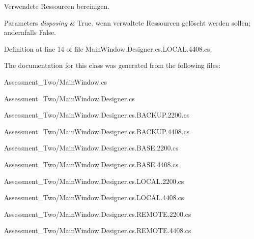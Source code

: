Verwendete Ressourcen bereinigen. 


\begin{DoxyParams}{Parameters}
{\em disposing} & True, wenn verwaltete Ressourcen gelöscht werden sollen; andernfalls False.\\
\hline
\end{DoxyParams}


Definition at line 14 of file MainWindow.Designer.cs.LOCAL.4408.cs.



The documentation for this class was generated from the following files:\begin{DoxyCompactItemize}
\item 
Assessment\_\-Two/MainWindow.cs\item 
Assessment\_\-Two/MainWindow.Designer.cs\item 
Assessment\_\-Two/MainWindow.Designer.cs.BACKUP.2200.cs\item 
Assessment\_\-Two/MainWindow.Designer.cs.BACKUP.4408.cs\item 
Assessment\_\-Two/MainWindow.Designer.cs.BASE.2200.cs\item 
Assessment\_\-Two/MainWindow.Designer.cs.BASE.4408.cs\item 
Assessment\_\-Two/MainWindow.Designer.cs.LOCAL.2200.cs\item 
Assessment\_\-Two/MainWindow.Designer.cs.LOCAL.4408.cs\item 
Assessment\_\-Two/MainWindow.Designer.cs.REMOTE.2200.cs\item 
Assessment\_\-Two/MainWindow.Designer.cs.REMOTE.4408.cs\end{DoxyCompactItemize}
